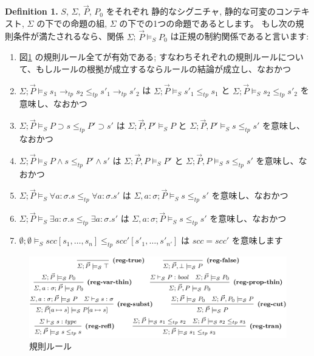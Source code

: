 \documentclass[submit,techreq,noauthor,onecolumn]{ipsj}
\begin{document}
{\bf Definition 1.}
$S$, $\Sigma$, $\vec{P}$, $P_0$ をそれぞれ 静的なシグニチャ, 静的な可変のコンテキスト, $\Sigma$ の下での命題の組, $\Sigma$ の下での1つの命題であるとします。
もし次の規則条件が満たされるなら、関係 $\Sigma$; $\vec{P} \models_S P_0$ は正規の制約関係であると言います:

\begin{enumerate}
  \item 図\ref{fig:fig2_regularity_rules} の規則ルール全てが有効である; すなわちそれぞれの規則ルールについて、もしルールの根拠が成立するならルールの結論が成立し、なおかつ
  \item $\Sigma; \vec{P} \models_S s_1 \rightarrow_{tp} s_2 \leq_{tp} s'_1 \rightarrow_{tp} s'_2$ は $\Sigma; \vec{P} \models_S s'_1 \leq_{tp} s_1$ と $\Sigma; \vec{P} \models_S s_2 \leq_{tp} s'_2$ を意味し、なおかつ
  \item $\Sigma; \vec{P} \models_S P \supset s \leq_{tp} P' \supset s'$ は $\Sigma; \vec{P},P' \models_S P$ と $\Sigma; \vec{P},P' \models_S s \leq_{tp} s'$ を意味し、なおかつ
  \item $\Sigma; \vec{P} \models_S P \wedge s \leq_{tp} P' \wedge s'$ は $\Sigma; \vec{P},P \models_S P'$ と $\Sigma; \vec{P},P \models_S s \leq_{tp} s'$ を意味し、なおかつ
  \item $\Sigma; \vec{P} \models_S \forall a : \sigma.s \leq_{tp} \forall a : \sigma.s'$ は $\Sigma , a: \sigma; \vec{P} \models_S s \leq_{tp} s'$ を意味し、なおかつ
  \item $\Sigma; \vec{P} \models_S \exists a : \sigma.s \leq_{tp} \exists a : \sigma.s'$ は $\Sigma , a: \sigma; \vec{P} \models_S s \leq_{tp} s'$ を意味し、なおかつ
  \item $\emptyset; \emptyset \models_S scc[s_1,\ldots,s_n] \leq_{tp} scc'[s'_1,\ldots,s'_{n'}]$ は $scc = scc'$ を意味します
\end{enumerate}

\begin{figure}[h]
\centering
\includegraphics[width=14cm]{img/fig2_regularity_rules.png}
\caption{規則ルール}
\label{fig:fig2_regularity_rules}
\end{figure}
\end{document}
